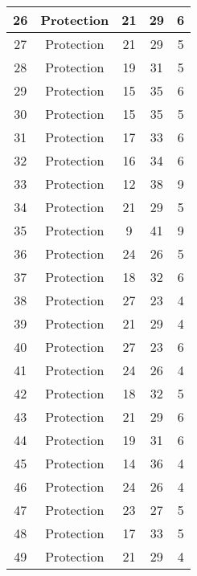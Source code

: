 \documentclass[results.tex]{subfiles}
\begin{document}
\begin{center}
\begin{tabular}{| c || c | c | c | c |}
    \hline
    26 & Protection & 21 & 29 & 6 \\ 
    \hline
    27 & Protection & 21 & 29 & 5 \\ 
    \hline
    28 & Protection & 19 & 31 & 5 \\ 
    \hline
    29 & Protection & 15 & 35 & 6 \\ 
    \hline
    30 & Protection & 15 & 35 & 5 \\ 
    \hline
    31 & Protection & 17 & 33 & 6 \\ 
    \hline
    32 & Protection & 16 & 34 & 6 \\ 
    \hline
    33 & Protection & 12 & 38 & 9 \\ 
    \hline
    34 & Protection & 21 & 29 & 5 \\ 
    \hline
    35 & Protection & 9 & 41 & 9 \\ 
    \hline
    36 & Protection & 24 & 26 & 5 \\ 
    \hline
    37 & Protection & 18 & 32 & 6 \\ 
    \hline
    38 & Protection & 27 & 23 & 4 \\ 
    \hline
    39 & Protection & 21 & 29 & 4 \\ 
    \hline
    40 & Protection & 27 & 23 & 6 \\ 
    \hline
    41 & Protection & 24 & 26 & 4 \\ 
    \hline
    42 & Protection & 18 & 32 & 5 \\ 
    \hline
    43 & Protection & 21 & 29 & 6 \\ 
    \hline
    44 & Protection & 19 & 31 & 6 \\ 
    \hline
    45 & Protection & 14 & 36 & 4 \\ 
    \hline
    46 & Protection & 24 & 26 & 4 \\ 
    \hline
    47 & Protection & 23 & 27 & 5 \\ 
    \hline
    48 & Protection & 17 & 33 & 5 \\ 
    \hline
    49 & Protection & 21 & 29 & 4 \\ 
    \hline   \end{tabular}
\end{center}
\end{document}

